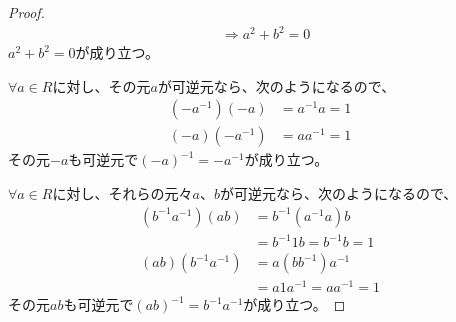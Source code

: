 \documentclass[dvipdfmx]{jsarticle}
\begin{document}
\begin{proof}
\begin{align*}
  &\Rightarrow a^{2} + b^{2} = 0
  \end{align*}
  $a^2 +b^2 =0$が成り立つ。\par
  $\forall a\in R$に対し、その元$a$が可逆元なら、次のようになるので、
  \begin{align*}
  \left( -a^{-1} \right) \left(-a\right) &= a^{-1} a =1\\
  \left( -a\right) \left(-a^{-1} \right) &= aa^{-1} =1
  \end{align*}
  その元$-a$も可逆元で$(-a)^{-1} =-a^{-1}$が成り立つ。\par
  $\forall a\in R$に対し、それらの元々$a$、$b$が可逆元なら、次のようになるので、
  \begin{align*}
  \left( b^{-1} a^{-1} \right) \left(ab\right) &= b^{-1} \left( a^{-1} a\right) b \\
  &= b^{-1} 1 b =b^{-1} b =1\\
  \left(ab\right)\left( b^{-1} a^{-1} \right) &= a\left( bb^{-1} \right) a^{-1} \\
  &=a1a^{-1} =aa^{-1} =1
  \end{align*}
  その元$ab$も可逆元で$(ab)^{-1} =b^{-1} a^{-1}$が成り立つ。
\end{proof}
\end{document}
